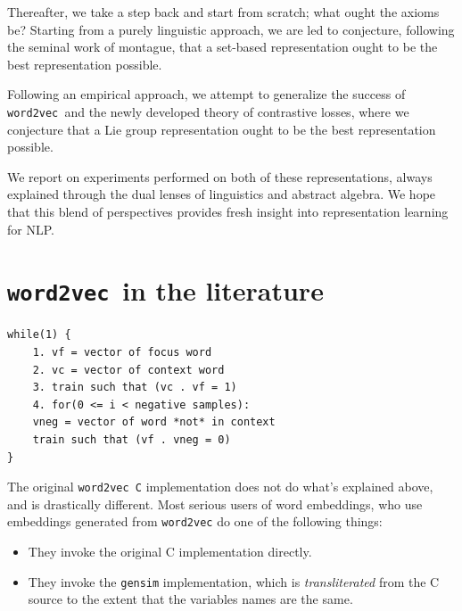 \documentclass[11pt]{book}
\newcommand{\wtov}{\texttt{word2vec }}
\begin{document}
Thereafter, we take a step back and start from scratch; what ought the axioms
be? Starting from a purely linguistic approach, we are led to conjecture, following
the seminal work of montague, that a set-based representation ought to be
the best representation possible.

Following an empirical approach, we attempt to generalize the success
of \wtov and the newly developed theory of contrastive losses, where we conjecture
that a Lie group representation ought to be the best representation possible.

We report on experiments performed on both of these representations, always
explained through the dual lenses of linguistics and abstract algebra. We hope
that this blend of perspectives provides fresh insight into representation
learning for NLP.

\section{\wtov in the literature}
\begin{verbatim}
while(1) {
	1. vf = vector of focus word
	2. vc = vector of context word
	3. train such that (vc . vf = 1)
	4. for(0 <= i < negative samples):
	vneg = vector of word *not* in context
	train such that (vf . vneg = 0)
}
\end{verbatim}

% 

The original \wtov \texttt{C} implementation does not do what's explained above,
and is drastically different. Most serious users of word embeddings, who use
embeddings generated from \texttt{word2vec} do one of the following things:

\begin{itemize}
	\item They invoke the original C implementation directly.
	\item They invoke the \texttt{gensim} implementation, which is
	\emph{transliterated} from the C source to the extent that the variables names
	are the same.
\end{itemize}
\end{document}
